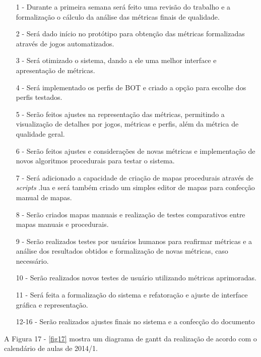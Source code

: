 \begin{itemize}
\item[1] - Durante a primeira semana será feito uma revisão do trabalho e a formalização o cálculo da análise das métricas finais de qualidade.

\item[2] - Será dado início no protótipo para obtenção das métricas formalizadas através de jogos automatizados. 

\item[3] - Será otimizado o sistema, dando a ele uma melhor interface e apresentação de métricas. 

\item[4] - Será implementado os perfis de BOT e criado a opção para escolhe dos perfis testados. 

\item[5] - Serão feitos ajustes na representação das métricas, permitindo a visualização de detalhes por jogos, métricas e perfis, além da métrica de qualidade geral.

\item[6] - Serão feitos ajustes e considerações de novas métricas e implementação de novos algoritmos procedurais para testar o sistema.

\item[7] - Será adicionado a capacidade de criação de mapas procedurais através de \textit{scripts} .lua e será também criado um simples editor de mapas para confecção manual de mapas.

\item[8] - Serão criados mapas manuais e realização de testes comparativos entre mapas manuais e procedurais. 

\item[9] - Serão realizados testes por usuários humanos para reafirmar métricas e a análise dos resultados obtidos e formalização de novas métricas, caso necessário.

\item[10] - Serão realizados novos testes de usuário utilizando métricas aprimoradas.

\item[11] - Será feita a formalização do sistema e refatoração e ajuste de interface gráfica e representação. 

\item[12-16] - Serão realizados ajustes finais no sistema e a confecção do documento
\end{itemize}

A Figura 17 - \ref{fig17} mostra um diagrama de gantt da realização de acordo com o calendário de aulas de 2014/1. 

